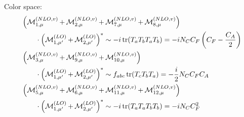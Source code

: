 Color space:
\begin{align}
&\left(\Md^{(NLO,v)}_{1,\mu}+\Md^{(NLO,v)}_{2,\mu} + \Md^{(NLO,v)}_{7,\mu}+\Md^{(NLO,v)}_{8,\mu}\right)\nonumber\\
&\hspace{20pt}\cdot\left(\Md^{(LO)}_{1,\mu'}+\Md^{(LO)}_{2,\mu'}\right)^*\sim -i\tr(T_aT_bT_aT_b) = -iN_C C_F \left(C_F - \frac{C_A}{2}\right)\\
&\left(\Md^{(NLO,v)}_{3,\mu}+ \Md^{(NLO,v)}_{9,\mu}+\Md^{(NLO,v)}_{10,\mu}\right)\nonumber\\
&\hspace{20pt}\cdot\left(\Md^{(LO)}_{1,\mu'}+\Md^{(LO)}_{2,\mu'}\right)^*\sim f_{abc}\tr(T_cT_bT_a) = -\frac i 2 N_C C_F C_A\\
&\left(\Md^{(NLO,v)}_{5,\mu}+\Md^{(NLO,v)}_{6,\mu}+\Md^{(NLO,v)}_{11,\mu}+\Md^{(NLO,v)}_{12,\mu}\right)\nonumber\\
&\hspace{20pt}\cdot\left(\Md^{(LO)}_{1,\mu'}+\Md^{(LO)}_{2,\mu'}\right)^*\sim -i\tr(T_aT_aT_bT_b) = -iN_C C_F^2
\end{align}
